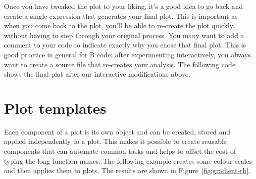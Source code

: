 % 


Once you have tweaked the plot to your liking, it's a good idea to go back and create a single expression that generates your final plot. This is important as when you come back to the plot, you'll be able to re-create the plot quickly, without having to step through your original process. You many want to add a comment to your code to indicate exactly why you chose that final plot. This is good practice in general for R code: after experimenting interactively, you always want to create a source file that re-creates your analysis.  The following code shows the final plot after our interactive modifications above.

% 


\section{Plot templates}
\label{sec:templates}

Each component of a \ggplot plot is its own object and can be created, stored and applied independently to a plot. This makes it possible to create reusable components that can automate common tasks and helps to offset the cost of typing the long function names. The following example creates some colour scales and then applies them to plots. The results are shown in Figure~\ref{fig:gradient-rb}.   

% 


